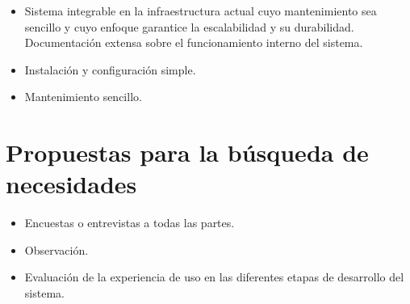 \begin{itemize}
  \item Sistema integrable en la infraestructura actual cuyo mantenimiento sea sencillo y cuyo enfoque garantice la escalabilidad y su durabilidad. Documentación extensa sobre el funcionamiento interno del sistema.
  \item Instalación y configuración simple.
  \item Mantenimiento sencillo.
\end{itemize}

\section{Propuestas para la búsqueda de necesidades}

\begin{itemize}
  \item Encuestas o entrevistas a todas las partes.
  \item Observación.
  \item Evaluación de la experiencia de uso en las diferentes etapas de desarrollo del sistema.
\end{itemize}


